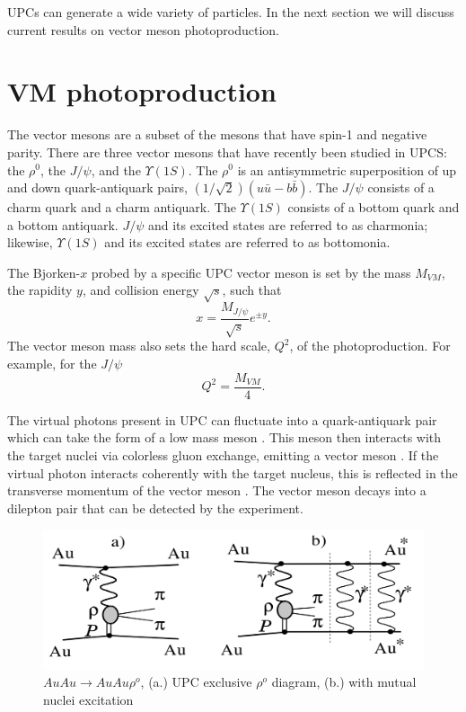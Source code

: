 UPCs can generate a wide variety of particles. In the next section we will discuss current results on vector meson photoproduction.

\section{VM photoproduction}
The vector mesons are a subset of the mesons that have spin-1 and negative parity. There are three vector mesons that have recently been studied in UPCS: the $\rho^0$, the $J/\psi$, and the $\Upsilon(1S)$. The $\rho^0$ is an antisymmetric superposition of up and down quark-antiquark pairs, $(1/\sqrt{2})(u\bar{u}-b\bar{b})$. The $J/\psi$ consists of a charm quark and a charm antiquark. The $\Upsilon(1S)$ consists of a bottom quark and a bottom antiquark. $J/\psi$ and its excited states are referred to as charmonia; likewise, $\Upsilon(1S)$ and its excited states are referred to as bottomonia.

The Bjorken-$x$ probed by a specific UPC vector meson is set by the mass $M_{VM}$, the rapidity $y$, and collision energy $\sqrt{s}$, such that
\begin{equation}
x = \frac{M_{J/\psi}}{\sqrt{s}}e^{\pm y}.
\end{equation} The vector meson mass also sets the hard scale, $Q^2$, of the photoproduction. For example, for the $J/\psi$
\begin{equation}
Q^2 = \frac{M_{VM}}{4}.
\end{equation}

The virtual photons present in UPC can fluctuate into a quark-antiquark pair which can take the form of a low mass meson \cite{lta2011.09,Chekanov:2002xi,Klasen:2007pm}. This meson then interacts with the target nuclei via colorless gluon exchange, emitting a vector meson \cite{Emling:1994gu,dePassos:2001dc,Ryskin:1992ui,Goldhaber:1948zza}. If the virtual photon interacts coherently with the target nucleus, this is reflected in the transverse momentum of the vector meson \cite{Goncalves:2011vf}. The vector meson decays into a dilepton pair that can be detected by the experiment.

\begin{figure}[h!]
\begin{centering}
\includegraphics[width=5.5in]{Chapter2/importfigs/upc_star_diagram.png}
\par\end{centering}
\caption{$AuAu \rightarrow AuAu\rho^o$, (a.) UPC exclusive $\rho^o$ diagram, (b.) with mutual nuclei excitation \cite{Adler:2002sc} \label{fig:upcRhoStar}}
\end{figure}

